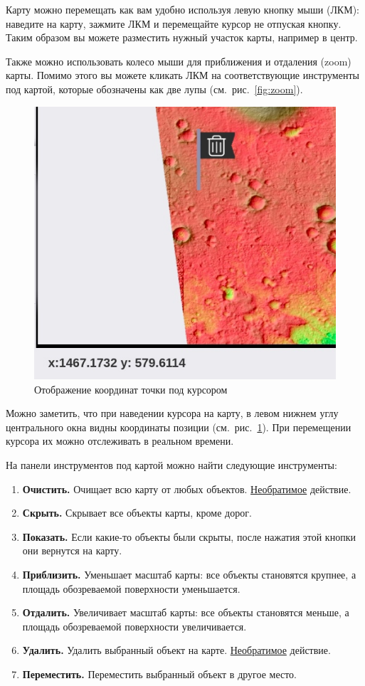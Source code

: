 Карту можно перемещать как вам удобно используя левую кнопку мыши (ЛКМ): наведите на карту, зажмите ЛКМ и перемещайте курсор не отпуская кнопку. Таким образом вы можете разместить нужный участок карты, например в центр.

Также можно использовать колесо мыши для приближения и отдаления (zoom) карты. Помимо этого вы можете кликать ЛКМ на соответствующие инструменты под картой, которые обозначены как две лупы (см.~рис.~\ref{fig:zoom}).

\begin{figure}[h!]
	\centering
	\includegraphics[width=.45\linewidth]{./img/coordinates}
	\caption{Отображение координат точки под курсором}\label{fig:coordinates}
\end{figure}

Можно заметить, что при наведении курсора на карту, в левом нижнем углу центрального окна видны координаты позиции (см.~рис.~\ref{fig:coordinates}). При перемещении курсора их можно отслеживать в реальном времени.

На панели инструментов под картой можно найти следующие инструменты: 

\begin{enumerate}
	\item \textbf{Очистить.} Очищает всю карту от любых объектов. \underline{Необратимое} действие.
	\item \textbf{Скрыть.} Скрывает все объекты карты, кроме дорог.
	\item \textbf{Показать.} Если какие-то объекты были скрыты, после нажатия этой кнопки они вернутся на карту.
	\item \textbf{Приблизить.} Уменьшает масштаб карты: все объекты становятся крупнее, а площадь обозреваемой поверхности уменьшается.
	\item \textbf{Отдалить.} Увеличивает масштаб карты: все объекты становятся меньше, а площадь обозреваемой поверхности увеличивается.
	\item \textbf{Удалить.} Удалить выбранный объект на карте. \underline{Необратимое} действие.
	\item \textbf{Переместить.} Переместить выбранный объект в другое место.
\end{enumerate}



